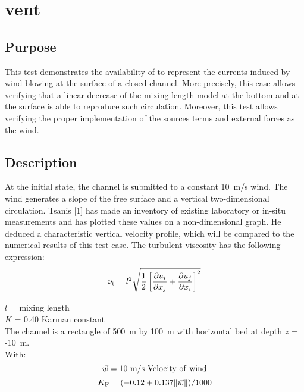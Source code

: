 \chapter{vent}
%
%
\section{Purpose}
%
This test demonstrates the availability of  to represent
the currents induced by wind blowing at the surface of a closed channel.
More precisely, this case allows verifying that a linear decrease of
the mixing length model at the bottom and at the surface is able to
reproduce such circulation.
Moreover, this test allows verifying the proper implementation of the
sources terms and external forces as the wind.
%
\section{Description}
%
At the initial state, the channel is submitted to a constant 10~m/s
wind.
The wind generates a slope of the free surface and a vertical
two-dimensional circulation.
Tsanis [1] has made an inventory of existing laboratory or in-situ
measurements and has plotted these values on a non-dimensional graph.
He deduced a characteristic vertical velocity profile, which will be
compared to the numerical results of this test case.
The turbulent viscosity has the following expression:
\begin{equation}
\nu_{\rm{t}} = l^2 \sqrt{\frac{1}{2}\left[ \frac{\partial u_i}{\partial x_j}
 + \frac{\partial u_j}{\partial x_i} \right]^2}
\end{equation}

$l$ = mixing length\\
$K$ = 0.40 Karman constant\\

The channel is a rectangle of 500~m by 100~m with horizontal bed at
depth $z$ = -10~m.\\
With:
\begin{equation}
\vec w = 10~\rm{m/s~Velocity~of~wind}
\end{equation}
\begin{equation}
K_{\rm{F}} = (-0.12 + 0.137 \| \vec w \| )/1000
\end{equation}
%
%
%
%
